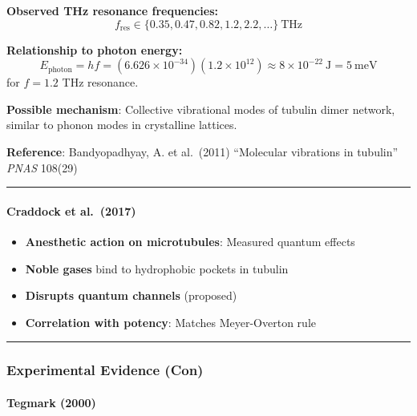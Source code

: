 \textbf{Observed THz resonance frequencies:}
\begin{equation}
\label{eq:thz-resonances}
f_{\text{res}} \in \{0.35, 0.47, 0.82, 1.2, 2.2, \ldots\}~\text{THz}
\end{equation}

\textbf{Relationship to photon energy:}
\begin{equation}
\label{eq:photon-energy}
E_{\text{photon}} = h f = (6.626 \times 10^{-34})(1.2 \times 10^{12}) \approx 8 \times 10^{-22}~\text{J} = 5~\text{meV}
\end{equation}
for $f = 1.2$ THz resonance.

\textbf{Possible mechanism}: Collective vibrational modes of tubulin dimer network, similar to phonon modes in crystalline lattices.

\textbf{Reference}: Bandyopadhyay, A. et al.~(2011) ``Molecular vibrations in tubulin'' \emph{PNAS} 108(29)

\begin{center}\rule{0.5\linewidth}{0.5pt}\end{center}

\paragraph{Craddock et al.~(2017)}\label{craddock-et-al.-2017}

\begin{itemize}
\tightlist
\item
  \textbf{Anesthetic action on microtubules}: Measured quantum effects
\item
  \textbf{Noble gases} bind to hydrophobic pockets in tubulin
\item
  \textbf{Disrupts quantum channels} (proposed)
\item
  \textbf{Correlation with potency}: Matches Meyer-Overton rule
\end{itemize}

\begin{center}\rule{0.5\linewidth}{0.5pt}\end{center}

\subsubsection{Experimental Evidence
(Con)}\label{experimental-evidence-con}

\paragraph{Tegmark (2000)}\label{tegmark-2000}

